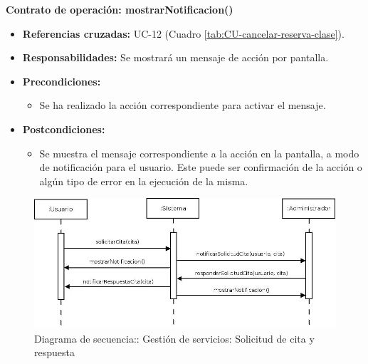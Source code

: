 \textbf{Contrato de operación: mostrarNotificacion()}
\begin{itemize}
\item \textbf{Referencias cruzadas:} UC-12 (Cuadro \ref{tab:CU-cancelar-reserva-clase}).
\item \textbf{Responsabilidades:} Se mostrará un mensaje de acción por pantalla.
\item \textbf{Precondiciones:} 
 \begin{itemize}
\item Se ha realizado la acción correspondiente para activar el mensaje.
\end {itemize}
\item \textbf{Postcondiciones:} 
 \begin{itemize}
\item Se muestra el mensaje correspondiente a la acción en la pantalla, a modo de notificación para el usuario. Este puede ser confirmación de la acción o algún tipo de error en la ejecución de la misma.
\end {itemize}
\end {itemize}


\vspace{10mm}

\begin{figure}[H]
\centering
  \includegraphics[scale=.45]{img/secuencias/gestion-servicios-solicitar-responder-cita.jpeg}
  \caption{Diagrama de secuencia:: Gestión de servicios: Solicitud de cita y respuesta}
  \label{fig:secuencia-gestion-servicios-solicitar-responder-cita.jpeg}
\end{figure}

